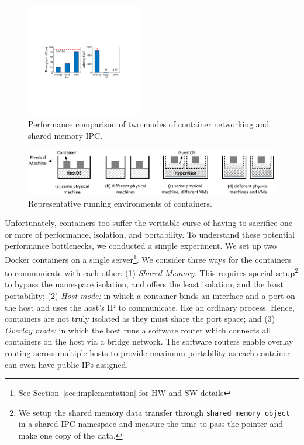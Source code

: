 \begin{figure}[th]
     \centering 
     \includegraphics[width=0.45\textwidth]{figures/intro/intro_exist2.pdf} 
     \caption{Performance comparison of two modes of container networking and shared memory IPC.} 
     \label{fig:three_modes} 
\end{figure} 
\begin{figure} [t]
	\centering
	\includegraphics[width=6.7in]{figures/deployment-cases.pdf} 
	\caption{\label{fig:deploy-cases} Representative running environments of containers.}
\end{figure}

Unfortunately, containers too suffer the veritable curse of having to sacrifice
one or more of performance, isolation, and portability. To understand these
potential performance bottlenecks, we conducted a simple experiment. We set up
two Docker containers on a single server\footnote{See Section~\ref{sec:implementation} for HW and SW details}. We consider three
ways for the containers to communicate with each other: (1) {\em Shared Memory:}
This requires special setup\footnote{We setup the shared memory data transfer
through \texttt{shared memory object} in a shared IPC namespace and measure the
time to pass the pointer and make one copy of the data.} to bypass the
namespace isolation, and offers the least isolation, and the least portability;
(2) {\em Host mode:} in which a container binds an interface and a port on the
host and uses the host's IP to communicate, like an ordinary process. Hence,
containers are not truly isolated as they must share the port space; and (3)
{\em Overlay mode:} in which the host runs a software router which connects all
containers on the host via a bridge network. The software routers enable
overlay routing across multiple hosts to provide maximum portability as each
container can even have public IPs assigned.

